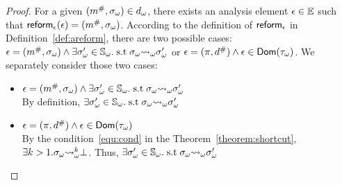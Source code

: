 \begin{proof}
  For a given $({m}^{\#}, {\sigma}_\omega) \in {{d}_\omega}$, there exists an analysis
  element $\epsilon \in \mathbb{E}$ such that $\textsf{reform}_\epsilon(\epsilon) = ({m}^{\#},
  {\sigma}_\omega)$.  According to the definition of $\textsf{reform}_\epsilon$ in
  Definition~\ref{def:areform}, there are two possible cases: $\epsilon =
  ({m}^{\#}, {\sigma}_\omega) \wedge \exists {\sigma}_\omega' \in {\mathbb{S}}_\omega. \; \text{s.t} \;
  {\sigma}_\omega {\leadsto}_\omega {\sigma}_\omega'$ or $\epsilon = (\pi, {d}^{\#}) \wedge \epsilon \in
  \textsf{Dom}({\tau}_\omega)$. We separately consider those two cases:
  \begin{itemize}
    \item $\epsilon = ({m}^{\#}, {\sigma}_\omega) \wedge \exists {\sigma}_\omega' \in {\mathbb{S}}_\omega.
      \; \text{s.t} \; {\sigma}_\omega {\leadsto}_\omega {\sigma}_\omega'$\\
        By definition, $\exists {\sigma}_\omega' \in {\mathbb{S}}_\omega.  \; \text{s.t} \;
        {\sigma}_\omega {\leadsto}_\omega {\sigma}_\omega'$
    \item $\epsilon = (\pi, {d}^{\#}) \wedge \epsilon \in \textsf{Dom}({\tau}_\omega)$\\
      By the condition~\ref{equ:cond} in the Theorem~\ref{theorem:shortcut},\\
      $\exists k > 1. {\sigma}_\omega {\leadsto}_\omega^k \bot$.  Thus, $\exists {\sigma}_\omega' \in
      {\mathbb{S}}_\omega.  \; \text{s.t} \; {\sigma}_\omega {\leadsto}_\omega {\sigma}_\omega'$
  \end{itemize}
\end{proof}


